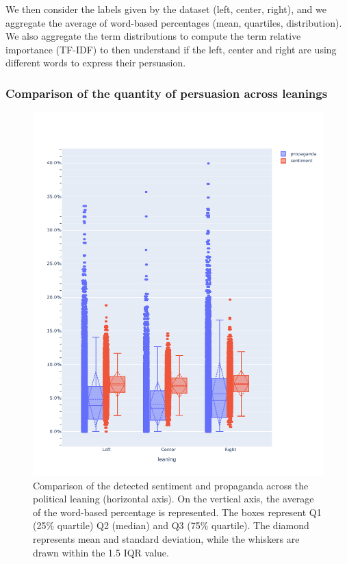 
We then consider the labels given by the dataset (left, center, right), and we aggregate the average of word-based percentages (mean, quartiles, distribution). %
We also aggregate the term distributions to compute the term relative importance (TF-IDF) to then understand if the left, center and right are using different words to express their persuasion.

\subsubsection{Comparison of the quantity of persuasion across leanings}

\begin{figure}[!htbp]
    \centering
    \includegraphics[width=\linewidth]{figures/prop_sent_tech_across_leaning_headlines_mod.pdf} %
    \caption{Comparison of the detected sentiment and propaganda across the political leaning (horizontal axis). On the vertical axis, the average of the word-based percentage is represented. The boxes represent Q1 (25\% quartile) Q2 (median) and Q3 (75\% quartile). The diamond represents mean and standard deviation, while the whiskers are drawn within the 1.5 IQR value.}
    \label{fig:prop_sent_across_leaning}
\end{figure}


